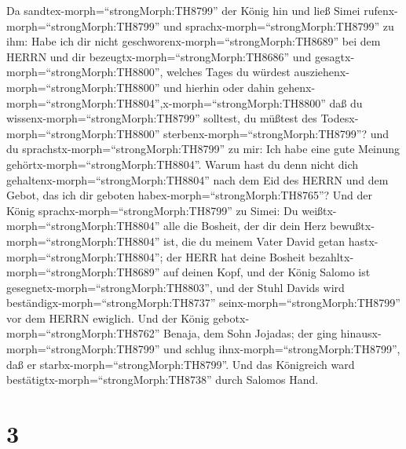 Da sandtex-morph=``strongMorph:TH8799'' der König hin und ließ Simei
rufenx-morph=``strongMorph:TH8799'' und
sprachx-morph=``strongMorph:TH8799'' zu ihm: Habe ich dir nicht
geschworenx-morph=``strongMorph:TH8689'' bei dem HERRN und dir
bezeugtx-morph=``strongMorph:TH8686'' und
gesagtx-morph=``strongMorph:TH8800'', welches Tages du würdest
ausziehenx-morph=``strongMorph:TH8800'' und hierhin oder dahin
gehenx-morph=``strongMorph:TH8804'',x-morph=``strongMorph:TH8800'' daß
du wissenx-morph=``strongMorph:TH8799'' solltest, du müßtest des
Todesx-morph=``strongMorph:TH8800''
sterbenx-morph=``strongMorph:TH8799''? und du
sprachstx-morph=``strongMorph:TH8799'' zu mir: Ich habe eine gute
Meinung gehörtx-morph=``strongMorph:TH8804''.  Warum hast
du denn nicht dich gehaltenx-morph=``strongMorph:TH8804'' nach dem Eid
des HERRN und dem Gebot, das ich dir geboten
habex-morph=``strongMorph:TH8765''?  Und der König
sprachx-morph=``strongMorph:TH8799'' zu Simei: Du
weißtx-morph=``strongMorph:TH8804'' alle die Bosheit, der dir dein Herz
bewußtx-morph=``strongMorph:TH8804'' ist, die du meinem Vater David
getan hastx-morph=``strongMorph:TH8804''; der HERR hat deine Bosheit
bezahltx-morph=``strongMorph:TH8689'' auf deinen Kopf,  und
der König Salomo ist gesegnetx-morph=``strongMorph:TH8803'', und der
Stuhl Davids wird beständigx-morph=``strongMorph:TH8737''
seinx-morph=``strongMorph:TH8799'' vor dem HERRN ewiglich. 
Und der König gebotx-morph=``strongMorph:TH8762'' Benaja, dem Sohn
Jojadas; der ging hinausx-morph=``strongMorph:TH8799'' und schlug
ihnx-morph=``strongMorph:TH8799'', daß er
starbx-morph=``strongMorph:TH8799''. Und das Königreich ward
bestätigtx-morph=``strongMorph:TH8738'' durch Salomos Hand.

\hypertarget{section-2}{%
\section{3}\label{section-2}}

